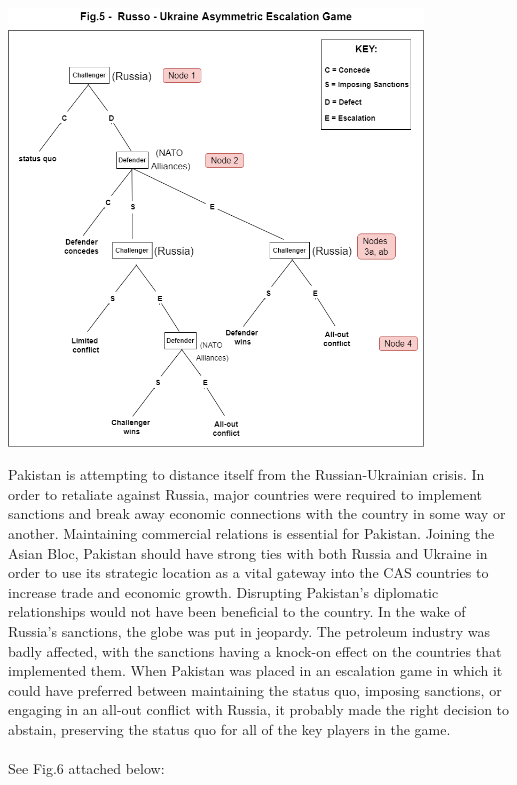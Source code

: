 \documentclass[runningheads]{llncs}
\begin{document}
\begin{center}
    \includegraphics[width=11cm]{russo_escalation.png}
\end{center}

Pakistan is attempting to distance itself from the Russian-Ukrainian crisis. In order to retaliate against Russia, major countries were required to implement sanctions and break away economic connections with the country in some way or another. Maintaining commercial relations is essential for Pakistan. Joining the Asian Bloc, Pakistan should have strong ties with both Russia and Ukraine in order to use its strategic location as a vital gateway into the CAS countries to increase trade and economic growth. Disrupting Pakistan's diplomatic relationships would not have been beneficial to the country. In the wake of Russia's sanctions, the globe was put in jeopardy. The petroleum industry was badly affected, with the sanctions having a knock-on effect on the countries that implemented them. When Pakistan was placed in an escalation game in which it could have preferred between maintaining the status quo, imposing sanctions, or engaging in an all-out conflict with Russia, it probably made the right decision to abstain, preserving the status quo for all of the key players in the game.
\\\\
See Fig.6 attached below: 
\end{document}
